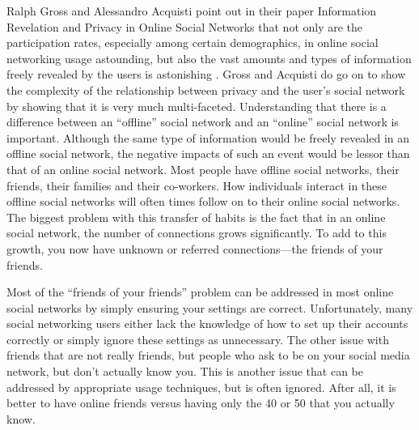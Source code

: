 \documentclass[conference]{IEEEtran}
\begin{document}
Ralph Gross and Alessandro Acquisti point out in their paper Information Revelation and Privacy in Online Social Networks that not only are the participation rates, especially among certain demographics, in online social networking usage astounding, but also the vast amounts and types of information freely revealed by the users is astonishing \cite{Gross:2005:IRP:1102199.1102214}. Gross and Acquisti do go on to show the complexity of the relationship between privacy and the user's social network by showing that it is very much multi-faceted\cite{Gross:2005:IRP:1102199.1102214}. Understanding that there is a difference between an “offline” social network and an “online” social network is important. Although the same type of information would be freely revealed in an offline social network, the negative impacts of such an event would be lessor than that of an online social network.   Most people have offline social networks, their friends, their families and their co-workers. How individuals interact in these offline social networks will often times follow on to their online social networks.  The biggest problem with this transfer of habits is the fact that in an online social network, the number of connections grows significantly. To add to this growth, you now have unknown or referred connections—the friends of your friends. 

Most of the “friends of your friends” problem can be addressed in most online social networks by simply ensuring your settings are correct.   Unfortunately, many social networking users either lack the knowledge of how to set up their accounts correctly or simply ignore these settings as unnecessary. The other issue with friends that are not really friends, but people who ask to be on your social media network, but don't actually know you.  This is another issue that can be addressed by appropriate usage techniques, but is often ignored.  After all, it is better to have online friends versus having only the 40 or 50 that you actually know. 
\end{document}
